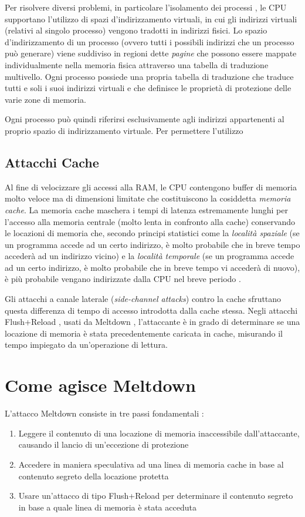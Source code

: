 Per risolvere diversi problemi, in particolare l'isolamento dei processi \cite{lettieri:paginazione}, le CPU supportano l'utilizzo di spazi d'indirizzamento virtuali, in cui gli indirizzi virtuali (relativi al singolo processo) vengono tradotti in indirizzi fisici. 
Lo spazio d'indirizzamento di un processo (ovvero tutti i possibili indirizzi che un processo può generare) viene suddiviso in regioni dette \emph{pagine} che possono essere mappate individualmente nella memoria fisica attraverso una tabella di traduzione multivello. 
Ogni processo possiede una propria tabella di traduzione che traduce tutti e soli i suoi indirizzi virtuali e che definisce le proprietà di protezione delle varie zone di memoria. 

Ogni processo può quindi riferirsi esclusivamente agli indirizzi appartenenti al proprio spazio di indirizzamento virtuale. Per permettere l'utilizzo 


\subsection{Attacchi Cache}
Al fine di velocizzare gli accessi alla RAM, le CPU contengono buffer di memoria molto veloce ma di dimensioni limitate che costituiscono la cosiddetta \emph{memoria cache}. La memoria cache maschera i tempi di latenza estremamente lunghi per l'accesso alla memoria centrale (molto lenta in confronto alla cache) conservando le locazioni di memoria che, secondo principi statistici come la \emph{località spaziale} (se un programma accede ad un certo indirizzo, è molto probabile che in breve tempo accederà ad un indirizzo vicino)  e la \emph{località temporale} (se un programma accede ad un certo indirizzo, è molto probabile che in breve tempo vi accederà di nuovo), è più probabile vengano indirizzate dalla CPU nel breve periodo \cite{lettieri:cache}.

Gli attacchi a canale laterale (\emph{side-channel attacks}) contro la cache sfruttano questa differenza di tempo di accesso introdotta dalla cache stessa. Negli attacchi Flush+Reload \cite{yaron:flush-reload}, usati da Meltdown \cite{lipp:meltdown}, l'attaccante è in grado di determinare se una locazione di memoria è stata precedentemente caricata in cache, misurando il tempo impiegato da un'operazione di lettura.

\section{Come agisce Meltdown}
L'attacco Meltdown consiste in tre passi fondamentali \cite{lipp:meltdown}:
\begin{enumerate}
	\item Leggere il contenuto di una locazione di memoria inaccessibile dall'attaccante, causando il lancio di un'eccezione di protezione
	\item Accedere in maniera speculativa ad una linea di memoria cache in base al contenuto segreto della locazione protetta
	\item Usare un'attacco di tipo Flush+Reload per determinare il contenuto segreto in base a quale linea di memoria è stata acceduta
\end{enumerate}

